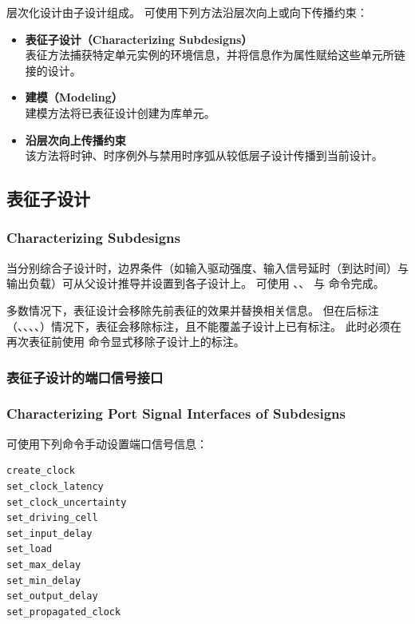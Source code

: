 层次化设计由子设计组成。
可使用下列方法沿层次向上或向下传播约束：
\begin{itemize}
  \item \textbf{表征子设计（Characterizing Subdesigns）}\\
        表征方法捕获特定单元实例的环境信息，并将信息作为属性赋给这些单元所链接的设计。
  \item \textbf{建模（Modeling）}\\
        建模方法将已表征设计创建为库单元。
  \item \textbf{沿层次向上传播约束}\\
        该方法将时钟、时序例外与禁用时序弧从较低层子设计传播到当前设计。
\end{itemize}

\subsection{表征子设计}
\subsubsection*{Characterizing Subdesigns}

当分别综合子设计时，边界条件（如输入驱动强度、输入信号延时（到达时间）与输出负载）可从父设计推导并设置到各子设计上。
可使用 、、 与  命令完成。

多数情况下，表征设计会移除先前表征的效果并替换相关信息。
但在后标注（、、、、）情况下，表征会移除标注，且不能覆盖子设计上已有标注。
此时必须在再次表征前使用  命令显式移除子设计上的标注。

\subsubsection{表征子设计的端口信号接口}
\subsubsection*{Characterizing Port Signal Interfaces of Subdesigns}

可使用下列命令手动设置端口信号信息：
\begin{lstlisting}
create_clock
set_clock_latency
set_clock_uncertainty
set_driving_cell
set_input_delay
set_load
set_max_delay
set_min_delay
set_output_delay
set_propagated_clock
\end{lstlisting}

